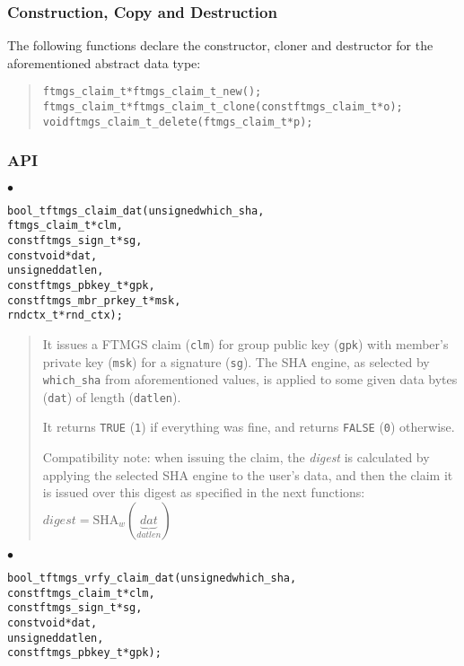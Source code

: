 \documentclass[a4paper]{article}
\newenvironment{code}%
{\begin{quote}\footnotesize\begin{alltt}}%
{\end{alltt}\end{quote}}%
\newenvironment{api}%
{\noindent$\bullet$\hfill\begin{minipage}[t]{0.97\linewidth}\footnotesize\begin{alltt}}%
{\end{alltt}\end{minipage}}%
\begin{document}
\subsubsection*{Construction, Copy and Destruction}
The following functions declare the constructor, cloner and destructor
for the aforementioned abstract data type:
\begin{code}
ftmgs_claim_t* ftmgs_claim_t_new();
ftmgs_claim_t* ftmgs_claim_t_clone(const ftmgs_claim_t* o);
void ftmgs_claim_t_delete(ftmgs_claim_t* p);
\end{code}
\subsubsection*{API}
\begin{api}
bool_t ftmgs_claim_dat(unsigned which_sha,
                       ftmgs_claim_t* clm,
                       const ftmgs_sign_t* sg,
                       const void* dat,
                       unsigned datlen,
                       const ftmgs_pbkey_t* gpk,
                       const ftmgs_mbr_prkey_t* msk,
                       rndctx_t* rnd_ctx);
\end{api}
\begin{quote}\footnotesize
It issues a FTMGS claim (\verb|clm|) for group public key (\verb|gpk|)
with member's private key (\verb|msk|) for a signature
(\verb|sg|). The SHA engine, as selected by \verb|which_sha| from
aforementioned values, is applied to some given data bytes
(\verb|dat|) of length (\verb|datlen|).

It returns \verb|TRUE| (\verb|1|) if everything was fine, and returns
\verb|FALSE| (\verb|0|) otherwise.

Compatibility note: when issuing the claim, the \emph{digest} is
calculated by applying the selected SHA engine to the user's data, and
then the claim it is issued over this digest as specified in
the next functions:\\
{$\mathit{digest} = \mathrm{SHA}_w(\underbrace{\mathit{dat}}_{\mathit{datlen}})$}
\end{quote}
\begin{api}
bool_t ftmgs_vrfy_claim_dat(unsigned which_sha,
                            const ftmgs_claim_t* clm,
                            const ftmgs_sign_t* sg,
                            const void* dat,
                            unsigned datlen,
                            const ftmgs_pbkey_t* gpk);
\end{api}
\end{document}
